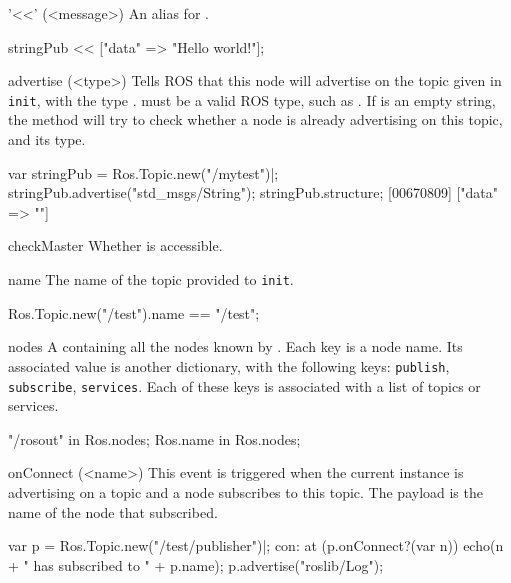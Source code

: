 \begin{urbiscriptapi}
\item['<<'](<message>)%
  An alias for .
\begin{urbiunchecked}
stringPub << ["data" => "Hello world!"];
\end{urbiunchecked}


\item[advertise](<type>)%
  Tells ROS that this node will advertise on the topic given in
  \lstinline{init}, with the type .  must be a valid ROS
  type, such as . If  is an empty string, the
  method will try to check whether a node is already advertising on this
  topic, and its type.
\begin{urbiscript}
var stringPub = Ros.Topic.new("/mytest")|;
stringPub.advertise("std_msgs/String");
stringPub.structure;
[00670809] ["data" => ""]
\end{urbiscript}


\item[checkMaster]
  Whether  is accessible.


\item[name]%
  The name of the topic provided to \lstinline{init}.
\begin{urbiassert}
Ros.Topic.new("/test").name == "/test";
\end{urbiassert}


\item[nodes]%
  A  containing all the nodes known by
  . Each key is a node name. Its associated value is
  another dictionary, with the following keys: \lstinline{publish},
  \lstinline{subscribe}, \lstinline{services}.  Each of these keys is
  associated with a list of topics or services.
\begin{urbiassert}
"/rosout" in Ros.nodes;
Ros.name in Ros.nodes;
\end{urbiassert}


\item[onConnect](<name>)%
  This event is triggered when the current instance is advertising on a
  topic and a node subscribes to this topic. The payload  is the
  name of the node that subscribed.
\begin{urbiunchecked}
var p = Ros.Topic.new("/test/publisher")|;
con: at (p.onConnect?(var n))
  echo(n + " has subscribed to " + p.name);
p.advertise("roslib/Log");
\end{urbiunchecked}



\end{urbiscriptapi}
